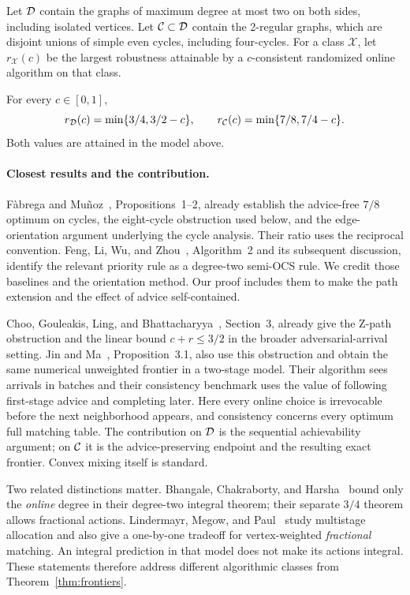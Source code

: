 Let $\mathcal D$ contain the graphs of maximum degree at most two on both sides,
including isolated vertices. Let $\mathcal C\subset\mathcal D$ contain the 2-regular graphs,
which are disjoint unions of simple even cycles, including four-cycles.
For a class $\mathcal X$, let $r_{\mathcal X}(c)$ be the largest robustness
attainable by a $c$-consistent randomized online algorithm on that class.

\begin{theorem}\label{thm:frontiers}
For every $c\in[0,1]$,
\[
 r_{\mathcal D}(c)=\min\{3/4,3/2-c\},\qquad
 r_{\mathcal C}(c)=\min\{7/8,7/4-c\}.
\]
Both values are attained in the model above.
\end{theorem}

\paragraph{Closest results and the contribution.}
F\`abrega and Mu\~noz~\cite{FM18}, Propositions~1--2, already establish the
advice-free $7/8$ optimum on cycles, the eight-cycle obstruction used below,
and the edge-orientation argument underlying the cycle analysis. Their ratio
uses the reciprocal convention. Feng, Li, Wu, and Zhou~\cite{FLWZ25},
Algorithm~2 and its subsequent discussion, identify the relevant priority rule
as a degree-two semi-OCS rule. We credit those baselines and the orientation
method. Our proof includes them to make the path extension and the effect of
advice self-contained.

Choo, Gouleakis, Ling, and Bhattacharyya~\cite{CGLB24}, Section~3, already give
the Z-path obstruction and the linear bound $c+r\le3/2$ in the broader
adversarial-arrival setting. Jin and Ma~\cite{JM24}, Proposition~3.1, also use
this obstruction and obtain the same numerical unweighted frontier in a
two-stage model. Their algorithm sees arrivals in batches and their
consistency benchmark uses the value of following first-stage advice and
completing later. Here every online choice is irrevocable before the next
neighborhood appears, and consistency concerns every optimum full matching
table. The contribution on $\mathcal D$ is the sequential achievability argument;
on $\mathcal C$ it is the advice-preserving endpoint and the resulting exact frontier.
Convex mixing itself is standard.

Two related distinctions matter. Bhangale, Chakraborty, and
Harsha~\cite{BCH25} bound only the \emph{online} degree in their degree-two
integral theorem; their separate $3/4$ theorem allows fractional actions.
Lindermayr, Megow, and Paul~\cite{LMP26} study multistage allocation and also
give a one-by-one tradeoff for vertex-weighted \emph{fractional} matching.
An integral prediction in that model does not make its actions integral.
These statements therefore address different algorithmic classes from
Theorem~\ref{thm:frontiers}.

